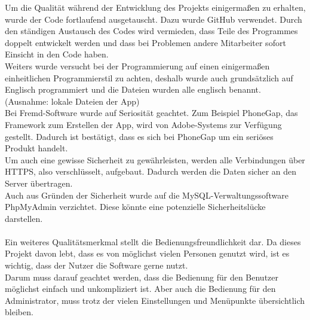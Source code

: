 Um die Qualität während der Entwicklung des Projekts einigermaßen zu erhalten, wurde der Code fortlaufend ausgetauscht. Dazu wurde GitHub verwendet. Durch den ständigen Austausch des Codes wird vermieden, dass Teile des Programmes doppelt entwickelt werden und dass bei Problemen andere Mitarbeiter sofort Einsicht in den Code haben.\\
Weiters wurde versucht bei der Programmierung auf einen einigermaßen einheitlichen Programmierstil zu achten, deshalb wurde auch grundsätzlich auf Englisch programmiert und die Dateien wurden alle englisch benannt. (Ausnahme: lokale Dateien der App)\\
Bei Fremd-Software wurde auf Seriosität geachtet. Zum Beispiel PhoneGap, das Framework zum Erstellen der App, wird von Adobe-Systems zur Verfügung gestellt. Dadurch ist bestätigt, dass es sich bei PhoneGap um ein seriöses Produkt handelt.\\
Um auch eine gewisse Sicherheit zu gewährleisten, werden alle Verbindungen über HTTPS, also verschlüsselt, aufgebaut. Dadurch werden die Daten sicher an den Server übertragen.\\
Auch aus Gründen der Sicherheit wurde auf die MySQL-Verwaltungssoftware PhpMyAdmin verzichtet. Diese könnte eine potenzielle Sicherheitslücke darstellen.\\
\\
Ein weiteres Qualitätsmerkmal stellt die Bedienungsfreundlichkeit dar. Da dieses Projekt davon lebt, dass es von möglichst vielen Personen genutzt wird, ist es wichtig, dass der Nutzer die Software gerne nutzt.\\
Darum muss darauf geachtet werden, dass die Bedienung für den Benutzer möglichst einfach und unkompliziert ist.
Aber auch die Bedienung für den Administrator, muss trotz der vielen Einstellungen und Menüpunkte übersichtlich bleiben.\\
 
